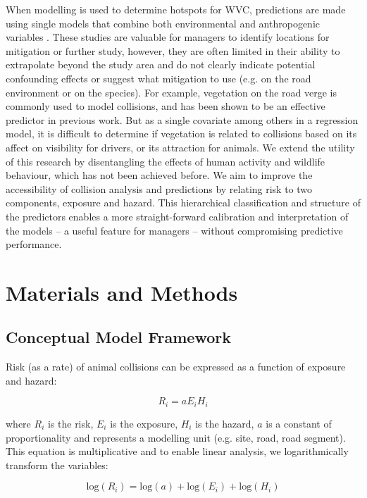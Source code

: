 When modelling is used to determine hotspots for WVC, predictions are made using single models that combine both environmental and anthropogenic variables \citep{malo04,ramp05,gome08,roge09,hoth12,bart14,meis14,snow14}. These studies are valuable for managers to identify locations  for mitigation or further study, however, they are often limited in their ability to extrapolate beyond the study area and do not clearly indicate potential confounding effects or suggest what mitigation to use (e.g. on the road environment or on the species). For example, vegetation on the road verge is commonly used to model collisions, and has been shown to be an effective predictor in previous work.  But as a single covariate among others in a regression model, it is difficult to determine if vegetation is related to collisions based on its affect on visibility for drivers, or its attraction for animals. We extend the utility of this research by disentangling the effects of human activity and wildlife behaviour, which has not been achieved before. We aim to improve the accessibility of collision analysis and predictions by relating risk to two components, exposure and hazard. This hierarchical classification and structure of the predictors enables a more straight-forward calibration and interpretation of the models -- a useful feature for managers -- without compromising predictive performance.

\section{Materials and Methods}

\subsection{Conceptual Model Framework}
Risk (as a rate) of animal collisions can be expressed as a function of exposure and hazard: 


\begin{equation} \label{eq:21}
R_i=aE_iH_i
\end{equation}

where $R_i$ is the risk, $E_i$ is the exposure, $H_i$ is the hazard, $a$ is a constant of proportionality and represents a modelling unit (e.g. site, road, road segment). This equation is multiplicative and to enable linear analysis, we logarithmically transform the variables: 

\begin{equation} \label{eq:22}
\text{log}(R_i)=\text{log}(a)+\text{log}(E_i)+\text{log}(H_i)
\end{equation}

